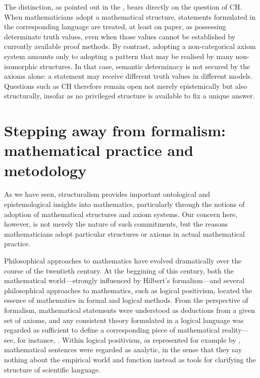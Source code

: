 \documentclass[11pt,a4paper]{book}
\theoremstyle{plain}
\begin{document}
The distinction, as pointed out in the , bears directly on the question of CH. When mathematicians adopt a mathematical structure, statements formulated in the corresponding language are treated, at least on paper, as possessing determinate truth values, even when those values cannot be established by currently available proof methods. By contrast, adopting a non-categorical axiom system amounts only to adopting a pattern that may be realised by many non-isomorphic structures. In that case, semantic determinacy is not secured by the axioms alone: a statement may receive different truth values in different models. Questions such as $\mathrm{CH}$ therefore remain open not merely epistemically but also structurally, insofar as no privileged structure is available to fix a unique answer.

\section{Stepping away from formalism: mathematical practice and metodology}
\label{quasi-emp-structuralism}

As we have seen, structuralism provides important ontological and epistemological insights into mathematics, particularly through the notions of adoption of mathematical structures and axiom systems. Our concern here, however, is not merely the nature of such commitments, but the reasons mathematicians adopt particular structures or axioms in actual mathematical practice.

Philosophical approaches to mathematics have evolved dramatically over the course of the twentieth century. At the beggining of this century, both the mathematical world—strongly influenced by Hilbert’s formalism—and several philosophical approaches to mathematics, such as logical positivism, located the essence of mathematics in formal and logical methods. From the perspective of formalism, mathematical statements were understood as deductions from a given set of axioms, and any consistent theory formulated in a logical language was regarded as sufficient to define a corresponding piece of mathematical reality—see, for instance, \textcite{hilbert1971geometry}. Within logical positivism, as represented for example by \textcite{carnap1937syntax}, mathematical sentences were regarded as analytic, in the sense that they say nothing about the empirical world and function instead as tools for clarifying the structure of scientific language.
\end{document}
